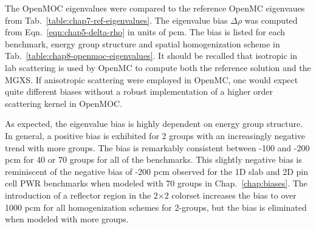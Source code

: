 The OpenMOC eigenvalues were compared to the reference OpenMC eigenvaues from Tab.~\ref{table:chap7-ref-eigenvalues}. The eigenvalue bias $\Delta\rho$ was computed from Eqn.~\ref{eqn:chap5-delta-rho} in units of \ac{pcm}. The bias is listed for each benchmark, energy group structure and spatial homogenization scheme in Tab.~\ref{table:chap8-openmoc-eigenvalues}. It should be recalled that isotropic in lab scattering is used by OpenMC to compute both the reference solution and the \ac{MGXS}. If anisotropic scattering were employed in OpenMC, one would expect quite different biases without a robust implementation of a higher order scattering kernel in OpenMOC.

As expected, the eigenvalue bias is highly dependent on energy group structure. In general, a positive bias is exhibited for 2 groups with an increasingly negative trend with more groups. The bias is remarkably consistent between -100 and -200 \ac{pcm} for 40 or 70 groups for all of the benchmarks. This slightly negative bias is reminiscent of the negative bias of -200 \ac{pcm} observed for the 1D slab and 2D pin cell \ac{PWR} benchmarks when modeled with 70 groups in Chap.~\ref{chap:biases}. The introduction of a reflector region in the 2$\times$2 colorset increases the bias to over 1000 \ac{pcm} for all homogenization schemes for 2-groups, but the bias is eliminated when modeled with more groups.

